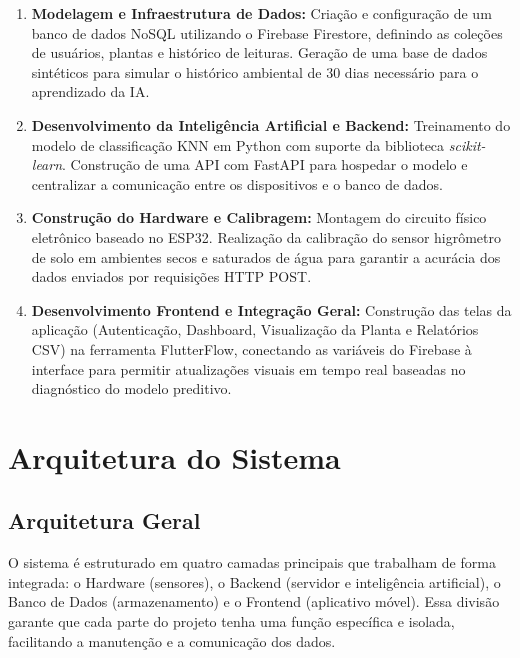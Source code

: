 \documentclass[
	12pt,
	article,
	oneside,
	a4paper,
	english,
	brazil
	]{abntex2}
\begin{document}
\begin{enumerate}
    \item \textbf{Modelagem e Infraestrutura de Dados:} Criação e configuração de um banco de dados NoSQL utilizando o Firebase Firestore, definindo as coleções de usuários, plantas e histórico de leituras. Geração de uma base de dados sintéticos para simular o histórico ambiental de 30 dias necessário para o aprendizado da IA.
    \item \textbf{Desenvolvimento da Inteligência Artificial e Backend:} Treinamento do modelo de classificação KNN em Python com suporte da biblioteca \textit{scikit-learn}. Construção de uma API com FastAPI para hospedar o modelo e centralizar a comunicação entre os dispositivos e o banco de dados.
    \item \textbf{Construção do Hardware e Calibragem:} Montagem do circuito físico eletrônico baseado no ESP32. Realização da calibração do sensor higrômetro de solo em ambientes secos e saturados de água para garantir a acurácia dos dados enviados por requisições HTTP POST.
    \item \textbf{Desenvolvimento Frontend e Integração Geral:} Construção das telas da aplicação (Autenticação, Dashboard, Visualização da Planta e Relatórios CSV) na ferramenta FlutterFlow, conectando as variáveis do Firebase à interface para permitir atualizações visuais em tempo real baseadas no diagnóstico do modelo preditivo.
\end{enumerate}

\section{Arquitetura do Sistema}

\subsection{Arquitetura Geral}
O sistema é estruturado em quatro camadas principais que trabalham de forma integrada: o Hardware (sensores), o Backend (servidor e inteligência artificial), o Banco de Dados (armazenamento) e o Frontend (aplicativo móvel). Essa divisão garante que cada parte do projeto tenha uma função específica e isolada, facilitando a manutenção e a comunicação dos dados.
\end{document}
